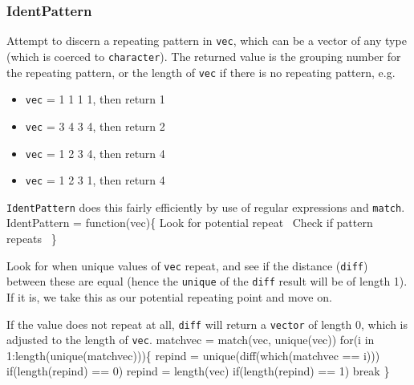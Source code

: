 \documentclass[a4paper]{article}
\begin{document}
\subsubsection{IdentPattern}
Attempt to discern a repeating pattern in \verb|vec|, which can be a
vector of any type (which is coerced to \verb|character|). The
returned value is the grouping number for the repeating pattern, or
the length of \verb|vec| if there is no repeating pattern, e.g.
\begin{itemize}
\item \verb|vec| = 1 1 1 1, then return 1
\item \verb|vec| = 3 4 3 4, then return 2
\item \verb|vec| = 1 2 3 4, then return 4
\item \verb|vec| = 1 2 3 1, then return 4
\end{itemize}
\verb|IdentPattern| does this fairly efficiently by use of regular
expressions and \verb|match|.
\nwenddocs{}\endmoddef
IdentPattern =
  function(vec)\{
    \LA{}Look for potential repeat~{\nwtagstyle{}}\RA{}
    \LA{}Check if pattern repeats~{\nwtagstyle{}}\RA{}
  \}
\eatline
{}\nwendcode{}\nwdocspar

Look for when unique values of \verb|vec| repeat, and see if the
distance (\verb|diff|) between these are equal (hence the
\verb|unique| of the \verb|diff| result will be of length 1). If it
is, we take this as our potential repeating point and move on.

If the value does not repeat at all, \verb|diff| will return a
\verb|vector| of length 0, which is adjusted to the length of
\verb|vec|.
\nwenddocs{}\endmoddef
matchvec = match(vec, unique(vec))
for(i in 1:length(unique(matchvec)))\{
  repind = unique(diff(which(matchvec == i)))
  if(length(repind) == 0)
    repind = length(vec)
  if(length(repind) == 1)
    break
\}
\nwendcode{}\nwdocspar
\end{document}
